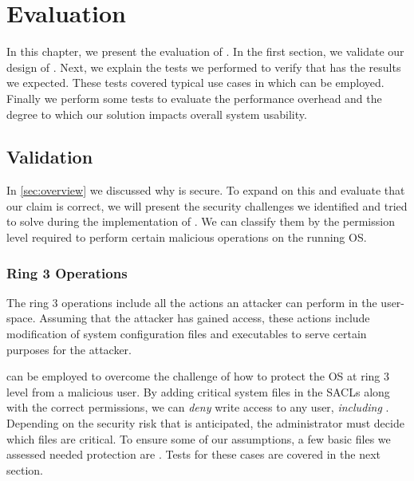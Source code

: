 \chapter{Evaluation}\label{ch:chapter4}

In this chapter, we present the evaluation of . In the first section, we validate our design of . Next, we explain the tests we performed to verify that  has the results we expected. These tests covered typical use cases in which  can be employed. Finally we perform some tests to evaluate the performance overhead and the degree to which our solution impacts overall system usability.

\section{Validation}\label{sec:validation}

\par In \ref{sec:overview} we discussed why  is secure. To expand on this and evaluate that our claim is correct, we will present the security challenges we identified and tried to solve during the implementation of . We can classify them by the permission level required to perform certain malicious operations on the running \ac{OS}. 

\subsection{Ring 3 Operations}

\par The ring 3 operations include all the actions an attacker can perform in the user-space. Assuming that the attacker has gained  access, these actions include modification of system configuration files and executables to serve certain purposes for the attacker. 
\par {} can be employed to overcome the challenge of how to protect the \ac{OS} at ring 3 level from a malicious  user. By adding critical system files in the \acp{SACL} along with the correct permissions, we can \emph{deny} write access to any user, \emph{including} . Depending on the security risk that is anticipated, the administrator must decide which files are critical. To ensure some of our assumptions, a few basic files we assessed needed protection are . Tests for these cases are covered in the next section.

